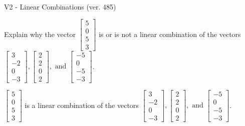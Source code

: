 \begin{exercise}
  \begin{exerciseTitle}V2 - Linear Combinations (ver. 485)\end{exerciseTitle}
  \begin{exerciseStatement}
    Explain why the vector \(\left[\begin{array}{c}
5 \\
0 \\
5 \\
3
\end{array}\right]\)  is or is not a linear 
	combination of the vectors \(\left[\begin{array}{c}
3 \\
-2 \\
0 \\
-3
\end{array}\right] , \left[\begin{array}{c}
2 \\
2 \\
0 \\
2
\end{array}\right] , \text{ and } \left[\begin{array}{c}
-5 \\
0 \\
-5 \\
-3
\end{array}\right]\).
	


  \end{exerciseStatement}
  \begin{exerciseAnswer}
   \(\left[\begin{array}{c}
5 \\
0 \\
5 \\
3
\end{array}\right]\) 
  	 is  
	a linear combination of the vectors \(\left[\begin{array}{c}
3 \\
-2 \\
0 \\
-3
\end{array}\right] , \left[\begin{array}{c}
2 \\
2 \\
0 \\
2
\end{array}\right] , \text{ and } \left[\begin{array}{c}
-5 \\
0 \\
-5 \\
-3
\end{array}\right]\).

	
  


  \end{exerciseAnswer}
\end{exercise}